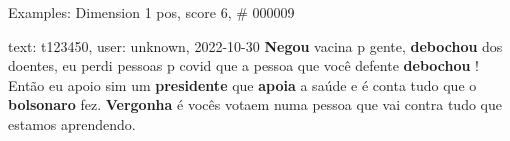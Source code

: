 \begin{frame}{Examples: Dimension 1 pos, score 6, \# 000009}
\footnotesize
\begin{exampleblock}{text: t123450, user: unknown, 2022-10-30}
\textbf{Negou} vacina p gente, \textbf{debochou} dos doentes, eu perdi pessoas 
p covid que a pessoa que você defente \textbf{debochou} ! Então eu apoio sim um 
\textbf{presidente} que \textbf{apoia} a saúde e é conta tudo que o 
\textbf{bolsonaro} fez. \textbf{Vergonha} é vocês votaem numa pessoa que vai 
contra tudo que estamos aprendendo. 
\end{exampleblock}
\end{frame}
